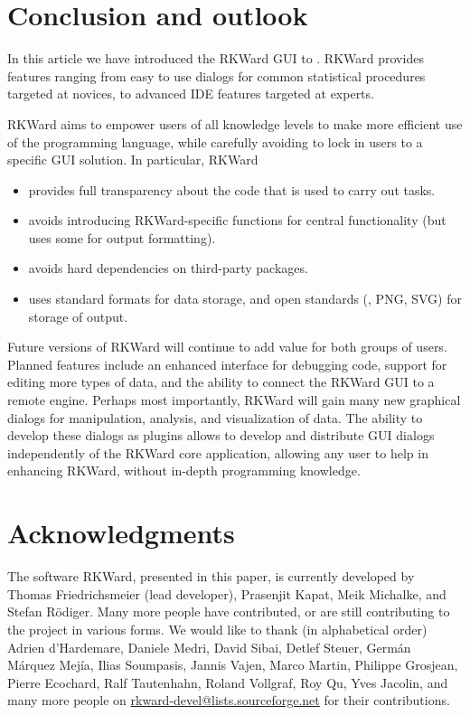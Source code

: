 \section{Conclusion and outlook}
\label{sec:conclusion_summary}
In this article we have introduced the RKWard GUI to . RKWard provides features ranging
from easy to use dialogs for common statistical procedures targeted at  novices, to advanced
IDE features targeted at  experts.

RKWard aims to empower users of all knowledge levels to make more efficient use of the 
 programming language, while carefully avoiding to lock in users to a specific
GUI solution. In particular, RKWard
\begin{itemize}
 \item provides full transparency about the  code that is used to carry out tasks.
 \item avoids introducing RKWard-specific  functions for central functionality (but uses some for output formatting).
 \item avoids hard dependencies on third-party  packages.
 \item uses standard  formats \citep[see][]{RDCT2010c} for data storage, and open standards (, PNG, SVG) for storage of output.
\end{itemize}

Future versions of RKWard will continue to add value for both groups of users. Planned features include
an enhanced interface for debugging  code, support for editing more types of data, and the
ability to connect the RKWard GUI to a remote  engine. Perhaps most importantly, RKWard will
gain many new graphical dialogs for manipulation, analysis, and visualization of data. The ability to
develop these dialogs as plugins allows to develop and distribute GUI dialogs
independently of the RKWard core application, allowing any user to help in enhancing RKWard, without in-depth
programming knowledge.

\section{Acknowledgments}
\label{sec:acknowledgments}
The software RKWard, presented in this paper, is currently developed by Thomas Friedrichsmeier (lead developer), Prasenjit Kapat, Meik Michalke,
and Stefan R\"odiger. Many more people have contributed, or are still contributing to the project in various forms. We would like to
thank (in alphabetical order) Adrien d'Hardemare, Daniele Medri, David Sibai, Detlef Steuer, Germ\'an M\'arquez Mej\'ia,
Ilias Soumpasis, Jannis Vajen, Marco Martin, Philippe Grosjean, Pierre Ecochard, Ralf Tautenhahn, Roland Vollgraf, Roy Qu,
Yves Jacolin, and many more people on \url{rkward-devel@lists.sourceforge.net} for their contributions.


